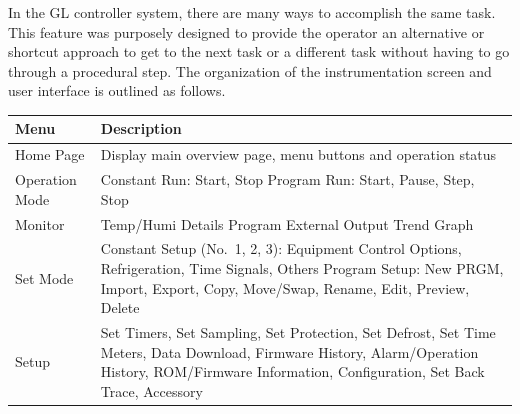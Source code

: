In the GL controller system, there are many ways to accomplish the same
task. This feature was purposely designed to provide the operator an
alternative or shortcut approach to get to the next task or a different
task without having to go through a procedural step. The organization of
the instrumentation screen and user interface is outlined as follows.

\begin{longtable}[]{@{}|l|l|@{}}
\toprule
\rowcolor{brown}\begin{minipage}[b]{0.13\columnwidth}\raggedright
{\bf{Menu}}\strut
\end{minipage} & \begin{minipage}[b]{0.81\columnwidth}\raggedright
{\bf{Description}}\strut
\end{minipage}\tabularnewline
\midrule
\endhead
\begin{minipage}[t]{0.13\columnwidth}\raggedright
Home Page\strut
\end{minipage} & \begin{minipage}[t]{0.81\columnwidth}\raggedright
Display main overview page, menu buttons and operation status\strut
\end{minipage}\tabularnewline
\begin{minipage}[t]{0.13\columnwidth}\raggedright
Operation Mode\strut
\end{minipage} & \begin{minipage}[t]{0.81\columnwidth}\raggedright
Constant Run: Start, Stop Program Run: Start, Pause, Step, Stop\strut
\end{minipage}\tabularnewline
\begin{minipage}[t]{0.13\columnwidth}\raggedright
Monitor\strut
\end{minipage} & \begin{minipage}[t]{0.81\columnwidth}\raggedright
Temp/Humi Details Program External Output Trend Graph\strut
\end{minipage}\tabularnewline
\begin{minipage}[t]{0.13\columnwidth}\raggedright
Set Mode\strut
\end{minipage} & \begin{minipage}[t]{0.81\columnwidth}\raggedright
Constant Setup (No.~1, 2, 3): Equipment Control Options, Refrigeration,
Time Signals, Others Program Setup: New PRGM, Import, Export, Copy,
Move/Swap, Rename, Edit, Preview, Delete\strut
\end{minipage}\tabularnewline
\begin{minipage}[t]{0.13\columnwidth}\raggedright
Setup\strut
\end{minipage} & \begin{minipage}[t]{0.81\columnwidth}\raggedright
Set Timers, Set Sampling, Set Protection, Set Defrost, Set Time Meters,
Data Download, Firmware History, Alarm/Operation History, ROM/Firmware
Information, Configuration, Set Back Trace, Accessory\strut
\end{minipage}\tabularnewline
\bottomrule
\end{longtable}


